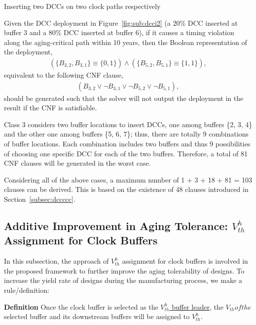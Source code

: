 \begin{class}
\label{class:c3}
Inserting two DCCs on two clock paths respectively

Given the DCC deployment in Figure~\ref{fig:sub:dcci2} (a 20\% DCC inserted at buffer 3 and a 80\% DCC inserted at buffer 6), if it causes a timing violation along the aging-critical path within 10 years, then the Boolean representation of the deployment,
{\fontsize{9}{10}
\begin{gather*}
\left(\{B_{3,2}, B_{3,1}\} \equiv \{0, 1\} \right) \land \left( \{B_{5,2}, B_{5,1}\} \equiv \{1, 1\} \right),
\end{gather*}}
equivalent to the following CNF clause,
{\fontsize{9}{10}
\begin{gather*}
\left(B_{3,2} \lor \neg B_{3,1} \lor \neg B_{5,2} \lor \neg B_{5,1} \right), 
\end{gather*}}
should be generated such that the solver will not output the deployment in the result if the CNF is satisfiable.

Class 3 considers two buffer locations to insert DCCs, one among buffers \{2, 3, 4\} and the other one among buffers \{5, 6, 7\}; thus, there are totally 9 combinations of buffer locations. Each combination includes two buffers and thus 9 possibilities of choosing one specific DCC for each of the two buffers. Therefore, a total of 81 CNF clauses will be generated in the worst case.

Considering all of the above cases, a maximum number of 1 + 3 + 18 + 81 = 103 clauses can be derived. This is based on the existence of 48 clauses introduced in Section~\ref{subsec:dccccc}.

\end{class}

\subsection{Additive Improvement in Aging Tolerance: $V_{th}^h$ Assignment for Clock Buffers}
In this subsection, the approach of $V_{th}^h$ assignment for clock buffers is involved in the proposed framework to further improve the aging tolerability of designs. To increase the yield rate of designs during the manufacturing process, we make a rule/definition: 

\noindent \textbf{Definition} Once the clock buffer is selected as the \uline{$V_{th}^h$ buffer leader}, the $V_{th} of the $selected buffer and its downstream buffers will be assigned to $V_{th}^h$.

